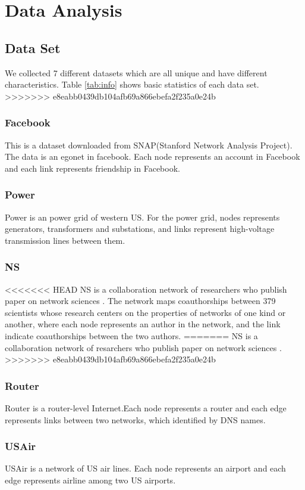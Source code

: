 \documentclass[12pt]{article}
\begin{document}
\section{Data Analysis}

\subsection {Data Set}
We collected 7 different datasets which are all unique and have different characteristics. Table \ref{tab:info} shows basic statistics of each data set.
>>>>>>> e8eabb0439db104afb69a866ebefa2f235a0e24b
\subsubsection{Facebook}
This is a dataset downloaded from SNAP(Stanford Network Analysis Project)\cite{snapnets}. The data is an egonet in facebook. Each node represents an account in Facebook and each link represents friendship in Facebook.
\subsubsection{Power}
Power is an power grid of western US.\cite{small_world} For the power grid, nodes represents generators, transformers and substations, and links represent high-voltage transmission lines between them.
\subsubsection{NS}
<<<<<<< HEAD
NS is a collaboration network of researchers who publish paper on network sciences \cite{Newman_2006}. The network maps coauthorships between 379 scientists whose research centers on the properties of networks of one kind or another, where each node represents an author in the network, and the link indicate coauthorships between the two authors.
=======
NS is a collaboration network of resarchers who publish paper on network sciences \cite{Newman_2006}.
>>>>>>> e8eabb0439db104afb69a866ebefa2f235a0e24b
\subsubsection{Router}
Router is a router-level Internet.\cite{router}Each node represents a router and each edge represents links between two networks, which identified by DNS names.
\subsubsection{USAir}
USAir is a network of US air lines. \cite{usair}Each node represents an airport and each edge represents airline among two US airports.
\end{document}
